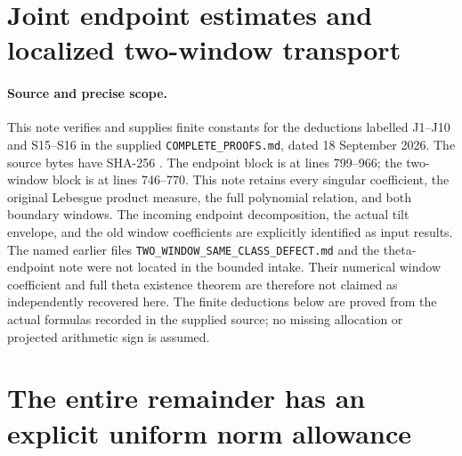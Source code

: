 \documentclass[11pt,a4paper]{article}
\begin{document}
\endgroup

\clearpage
\begingroup
\def\C{\mathbb C}
\def\R{\mathbb R}
\def\Pcal{\mathcal P}
\def\norm#1{\left\lVert#1\right\rVert}
\def\abs#1{\left|#1\right|}

\setcounter{equation}{0}
\renewcommand{\theequation}{JW.\arabic{equation}}
\section*{Joint endpoint estimates and localized two-window transport}



\paragraph{Source and precise scope.}
This note verifies and supplies finite constants for the deductions labelled
J1--J10 and S15--S16 in the supplied \texttt{COMPLETE\_PROOFS.md}, dated
18 September 2026.  The source bytes have SHA-256
.
The endpoint block is at lines 799--966; the two-window block is at
lines 746--770.  This note retains every singular coefficient, the original
Lebesgue product measure, the full polynomial relation, and both boundary
windows.  The incoming endpoint decomposition, the actual tilt envelope,
and the old window coefficients are explicitly identified as input results.
The named earlier files \texttt{TWO\_WINDOW\_SAME\_CLASS\_DEFECT.md} and the
theta-endpoint note were not located in the bounded intake.  Their numerical
window coefficient and full theta existence theorem are therefore not
claimed as independently recovered here.  The finite deductions below are
proved from the actual formulas recorded in the supplied source; no missing
allocation or projected arithmetic sign is assumed.

\section{The entire remainder has an explicit uniform norm allowance}
\end{document}
